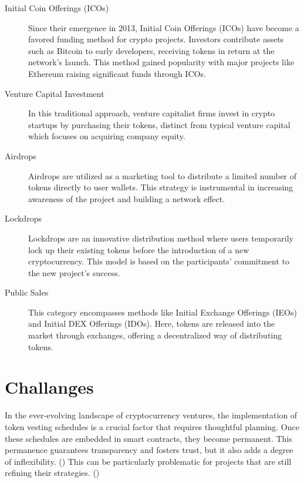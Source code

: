 \documentclass[12pt,oneside]{article}
\begin{document}
\begin{description}
  \item[Initial Coin Offerings (ICOs)]
  Since their emergence in 2013, Initial Coin Offerings (ICOs) have become a favored funding 
  method for crypto projects. Investors contribute assets such as Bitcoin to early developers, 
  receiving tokens in return at the network's launch. This method gained popularity with major projects 
  like Ethereum raising significant funds through ICOs.

  \item[Venture Capital Investment]
  In this traditional approach, venture capitalist firms invest in crypto startups by 
  purchasing their tokens, distinct from typical venture capital which focuses on acquiring company equity.

  \item[Airdrops]
  Airdrops are utilized as a marketing tool to distribute a limited number of 
  tokens directly to user wallets. This strategy is instrumental in increasing awareness 
  of the project and building a network effect.

  \item[Lockdrops]
  Lockdrops are an innovative distribution method where users temporarily lock up their existing 
  tokens before the introduction of a new cryptocurrency. This model is based on the participants' 
  commitment to the new project's success.

  \item[Public Sales]
  This category encompasses methods like Initial Exchange Offerings (IEOs) and Initial DEX Offerings
  (IDOs). Here, tokens are released into the market through exchanges, offering a decentralized way 
  of distributing tokens.
\end{description}


\section{Challanges}

In the ever-evolving landscape of cryptocurrency ventures, the implementation of token vesting schedules is 
a crucial factor that requires thoughtful planning. Once these schedules are embedded in smart contracts, 
they become permanent. This permanence guarantees transparency and fosters trust, but it also adds a degree 
of inflexibility. (\cite{liu2022fighting}) This can be particularly problematic for projects that are still refining their strategies. (\cite{messias2023airdrops})
\end{document}
